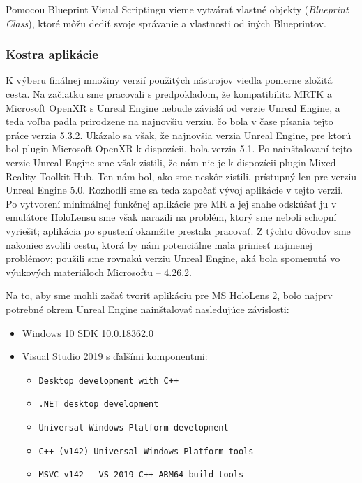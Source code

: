 Pomocou Blueprint Visual Scriptingu vieme vytvárať vlastné objekty (\emph{Blueprint Class}), ktoré môžu dediť svoje správanie a vlastnosti od iných Blueprintov.

\subsubsection{Kostra aplikácie}
K výberu finálnej množiny verzií použitých nástrojov viedla pomerne zložitá cesta. Na začiatku sme pracovali s predpokladom, že kompatibilita MRTK a Microsoft OpenXR s Unreal Engine nebude závislá od verzie Unreal
Engine, a teda voľba padla prirodzene na najnovšiu verziu, čo bola v čase písania tejto práce verzia 5.3.2. Ukázalo sa však, že najnovšia verzia Unreal Engine, pre ktorú bol plugin Microsoft OpenXR k dispozícii, bola verzia 5.1.
Po nainštalovaní tejto verzie Unreal Engine sme však zistili, že nám nie je k dispozícii plugin Mixed Reality Toolkit Hub. Ten nám bol, ako sme neskôr zistili, prístupný len pre verziu Unreal Engine 5.0. Rozhodli sme sa teda
započať vývoj aplikácie v tejto verzii. Po vytvorení minimálnej funkčnej aplikácie pre MR a jej snahe odskúšať ju v emulátore HoloLensu sme však narazili na problém, ktorý sme neboli schopní vyriešiť; aplikácia po spustení
okamžite prestala pracovať. 
Z týchto dôvodov sme nakoniec zvolili cestu, ktorá by nám potenciálne mala priniesť najmenej problémov; použili sme rovnakú verziu Unreal Engine, aká bola spomenutá vo výukových materiáloch Microsoftu {--} 4.26.2.

Na to, aby sme mohli začať tvoriť aplikáciu pre MS HoloLens 2, bolo najprv potrebné okrem Unreal Engine nainštalovať nasledujúce závislosti:
\begin{itemize}
  \item Windows 10 SDK 10.0.18362.0
  \item Visual Studio 2019 s ďalšími komponentmi:
  \begin{itemize}    
    \item \texttt{Desktop development with C++}
    \item \texttt{.NET desktop development}
    \item \texttt{Universal Windows Platform development}
    \item \texttt{C++ (v142) Universal Windows Platform tools}
    \item \texttt{MSVC v142 {--} VS 2019 C++ ARM64 build tools}    
  \end{itemize}
\end{itemize}

